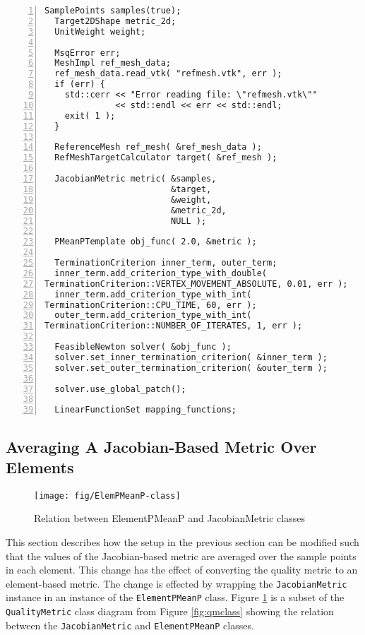 \documentclass{article}
\begin{document}
\begin{lstlisting}[caption={Example Quality Improver with Jacobian-Based Metric},label={lst:jacobianex},numbers=left]
  SamplePoints samples(true);
  Target2DShape metric_2d;
  UnitWeight weight;

  MsqError err;
  MeshImpl ref_mesh_data;
  ref_mesh_data.read_vtk( "refmesh.vtk", err );
  if (err) {
    std::cerr << "Error reading file: \"refmesh.vtk\""
              << std::endl << err << std::endl;
    exit( 1 );
  }

  ReferenceMesh ref_mesh( &ref_mesh_data );
  RefMeshTargetCalculator target( &ref_mesh );

  JacobianMetric metric( &samples,
                         &target,
                         &weight,
                         &metric_2d,
                         NULL );

  PMeanPTemplate obj_func( 2.0, &metric );

  TerminationCriterion inner_term, outer_term;
  inner_term.add_criterion_type_with_double(
TerminationCriterion::VERTEX_MOVEMENT_ABSOLUTE, 0.01, err );
  inner_term.add_criterion_type_with_int(
TerminationCriterion::CPU_TIME, 60, err );
  outer_term.add_criterion_type_with_int(
TerminationCriterion::NUMBER_OF_ITERATES, 1, err );

  FeasibleNewton solver( &obj_func );
  solver.set_inner_termination_criterion( &inner_term );
  solver.set_outer_termination_criterion( &outer_term );

  solver.use_global_patch();

  LinearFunctionSet mapping_functions;
\end{lstlisting}

\subsection{Averaging A Jacobian-Based Metric Over Elements}

\begin{figure}[h]
\begin{center}
\texttt{[image: fig/ElemPMeanP-class]}
\caption{Relation between ElementPMeanP and JacobianMetric classes \label{fig:elempmeanp}}
\end{center}
\end{figure}

This section describes how the setup in the previous section can be modified such that the values of the Jacobian-based metric are averaged over the sample points in each element.  This change has the effect of converting the quality metric to an element-based metric.  The change is effected by wrapping the \texttt{JacobianMetric} instance in an instance of the \texttt{ElementPMeanP} class.  Figure \ref{fig:elempmeanp} is a subset of the \texttt{QualityMetric} class diagram from Figure \ref{fig:qmclass} showing the relation between the \texttt{JacobianMetric} and \texttt{ElementPMeanP} classes.
\end{document}
